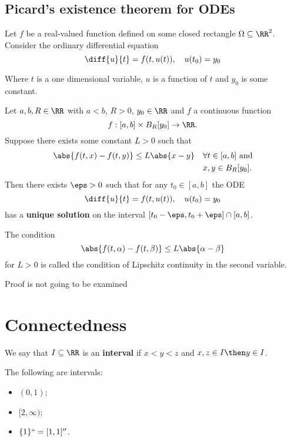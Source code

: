 \documentclass[12pt, a4paper]{article}
\begin{document}
\subsection{Picard's existence theorem for ODEs}

Let \(f\) be a real-valued function defined on some closed rectangle \(\Omega \subseteq \RR^2\). Consider the ordinary differential equation 
\[\diff{u}{t} = f(t,u(t)), \quad u(t_0)=y_0\]

Where \(t\) is a one dimensional variable, \(u\) is a function of \(t\) and \(y_0\) is some constant.

\begin{mdthm}
    Let \(a,b,R \in \RR\) with \(a<b\), \(R>0\), \(y_0 \in \RR\) and \(f\) a continuous function 
    \[f: [a,b] \times B_R[y_0] \to \RR.\]
    Suppose there exists some constant \(L>0\) such that 
    \[\begin{aligned}
        \abs{f(t,x)-f(t,y)} \leq L\abs{x-y} \quad &\forall t \in [a,b] \text{ and}\\
        &x,y \in B_R[y_0].
    \end{aligned}\]
    Then there exists \(\eps>0\) such that for any \(t_0 \in [a,b]\) the ODE
    \[\diff{u}{t} = f(t,u(t)), \quad u(t_0)=y_0\]
    has a \textbf{unique solution} on the interval \([t_0-\eps,t_0+\eps] \cap [a,b]\).
\end{mdthm}

\begin{mdremark}
    The condition 
    \[\abs{f(t,\alpha)-f(t,\beta)} \leq L \abs{\alpha-\beta}\]
    for \(L >0\) is called the condition of Lipschitz continuity in the second variable.
\end{mdremark}

\begin{mdremark}
    Proof is not going to be examined 
\end{mdremark}

\section{Connectedness}

\begin{definition}
    We say that \(I \subseteq \RR\) is an \textbf{interval} if \(x<y<z\) and \(x,z \in I \then y \in I\).
\end{definition}

\begin{example}
    The following are intervals:
    \begin{itemize}
        \item \((0,1)\);
        \item \([2,\infty)\);
        \item \(\{1\} ``=[1,1]''\).
    \end{itemize}
\end{example}
\end{document}
